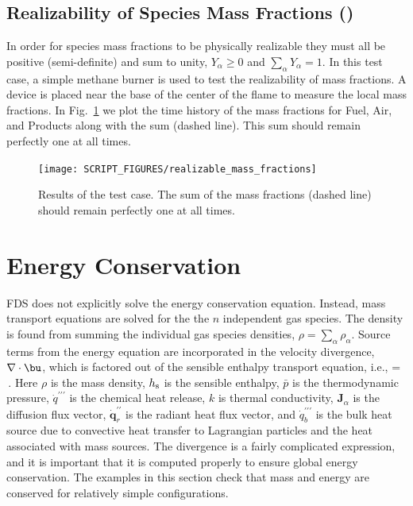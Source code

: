 \documentclass[11pt]{book}
\begin{document}
\subsection{Realizability of Species Mass Fractions (\texorpdfstring{}{realizable\_mass\_fractions})}
\label{realizable_mass_fractions}

In order for species mass fractions to be physically realizable they must all be positive (semi-definite) and sum to unity, $Y_\alpha\ge0$ and $\sum_\alpha Y_\alpha=1$.  In this test case, a simple methane burner is used to test the realizability of mass fractions.  A device is placed near the base of the center of the flame to measure the local mass fractions.  In Fig.~\ref{fig:realizable_mass_fractions} we plot the time history of the mass fractions for Fuel, Air, and Products along with the sum (dashed line).  This sum should remain perfectly one at all times.
\begin{figure}[ht]
\centering
\texttt{[image: SCRIPT\_FIGURES/realizable\_mass\_fractions]}
\caption[The  test case]{Results of the  test case.  The sum of the mass fractions (dashed line) should remain perfectly one at all times.}
\label{fig:realizable_mass_fractions}
\end{figure}




\section{Energy Conservation}

FDS does not explicitly solve the energy conservation equation. Instead, mass transport equations are solved for the the $n$ independent gas species.  The density is found from summing the individual gas species densities, $\rho = \sum_\alpha \rho_\alpha$. Source terms from the energy equation are incorporated in the velocity  divergence, $\nabla \cdot \bu$, which is factored out of the sensible enthalpy transport equation, i.e.,
\be
\label{eqn_new_div}
\nabla\cdot{} =   \,\mbox{.}
\ee
Here $\rho$ is the mass density, $h_{\rm s}$ is the sensible enthalpy, $\bar{p}$ is the thermodynamic pressure, $\dot{q}^{\prime\prime\prime}$ is the chemical heat release, $k$ is thermal conductivity, $\mathbf{J}_\alpha$ is the diffusion flux vector, $\dot{\mathbf{q}}_r^{\prime\prime}$ is the radiant heat flux vector, and $\dot{q}_b^{\prime\prime\prime}$ is the bulk heat source due to convective heat transfer to Lagrangian particles and the heat associated with mass sources. The divergence is a fairly complicated expression, and it is important that it is computed properly to ensure global energy conservation. The examples in this section check that mass and energy are conserved for relatively simple configurations.
\end{document}
